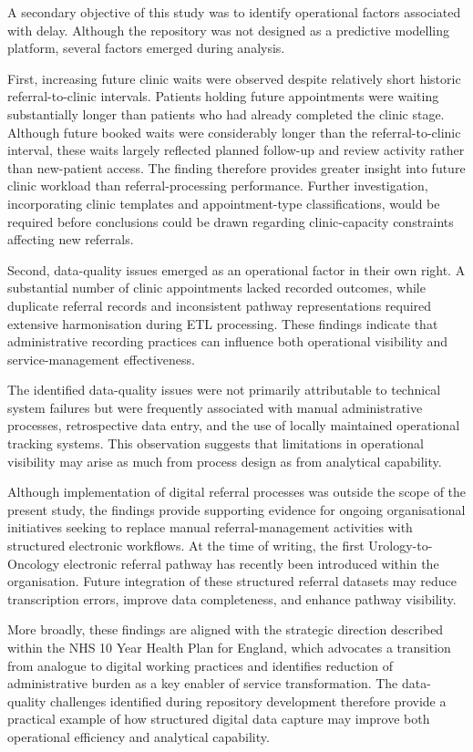 A secondary objective of this study was to identify operational factors associated with delay. Although the repository was not designed as a predictive modelling platform, several factors emerged during analysis. 

First, increasing future clinic waits were observed despite relatively short historic referral-to-clinic intervals. Patients holding future appointments were waiting substantially longer than patients who had already completed the clinic stage. Although future booked waits were considerably longer than the referral-to-clinic interval, these waits largely reflected planned follow-up and review activity rather than new-patient access. The finding therefore provides greater insight into future clinic workload than referral-processing performance. Further investigation, incorporating clinic templates and appointment-type classifications, would be required before conclusions could be drawn regarding clinic-capacity constraints affecting new referrals.

Second, data-quality issues emerged as an operational factor in their own right. A substantial number of clinic appointments lacked recorded outcomes, while duplicate referral records and inconsistent pathway representations required extensive harmonisation during ETL processing. These findings indicate that administrative recording practices can influence both operational visibility and service-management effectiveness. 

The identified data-quality issues were not primarily attributable to technical system failures but were frequently associated with manual administrative processes, retrospective data entry, and the use of locally maintained operational tracking systems. This observation suggests that limitations in operational visibility may arise as much from process design as from analytical capability. 

Although implementation of digital referral processes was outside the scope of the present study, the findings provide supporting evidence for ongoing organisational initiatives seeking to replace manual referral-management activities with structured electronic workflows. At the time of writing, the first Urology-to-Oncology electronic referral pathway has recently been introduced within the organisation. Future integration of these structured referral datasets may reduce transcription errors, improve data completeness, and enhance pathway visibility. 

More broadly, these findings are aligned with the strategic direction described within the NHS 10 Year Health Plan for England, which advocates a transition from analogue to digital working practices and identifies reduction of administrative burden as a key enabler of service transformation. The data-quality challenges identified during repository development therefore provide a practical example of how structured digital data capture may improve both operational efficiency and analytical capability. \citep{DHSC2025} 

